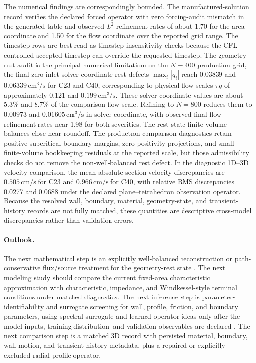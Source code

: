 The numerical findings are correspondingly bounded. The manufactured-solution
record verifies the declared forced operator with zero forcing-audit mismatch in
the generated table and observed $L^2$ refinement rates of about 1.70 for the
area coordinate and 1.50 for the flow coordinate over the reported grid range.
The timestep rows are best read as timestep-insensitivity checks because the
CFL-controlled accepted timestep can override the requested timestep. The
geometry-rest audit is the principal numerical limitation: on the $N=400$
production grid, the final zero-inlet solver-coordinate rest defects
$\max_i |q_i|$ reach $0.03839$ and $0.06339\,\mathrm{cm}^3/\mathrm{s}$ for C23
and C40, corresponding to physical-flow scales $\pi q$ of approximately
$0.121$ and $0.199\,\mathrm{cm}^3/\mathrm{s}$. These solver-coordinate values
are about 5.3\% and 8.7\% of the comparison flow scale. Refining to $N=800$
reduces them to $0.00973$ and $0.01605\,\mathrm{cm}^3/\mathrm{s}$ in solver
coordinate, with observed final-flow refinement rates near 1.98 for both
severities. The rest-state finite-volume balances close near roundoff. The
production comparison diagnostics retain positive subcritical boundary margins,
zero positivity projections, and small finite-volume bookkeeping residuals at
the reported scale, but those admissibility checks do not remove the
non-well-balanced rest defect. In the diagnostic 1D--3D velocity comparison, the
mean absolute section-velocity discrepancies are $0.505\,\mathrm{cm}/\mathrm{s}$
for C23 and $0.966\,\mathrm{cm}/\mathrm{s}$ for C40, with relative RMS
discrepancies 0.0277 and 0.0688 under the declared plane--tetrahedron
observation operator. Because the resolved wall, boundary, material,
geometry-state, and transient-history records are not fully matched, these
quantities are descriptive cross-model discrepancies rather than validation
errors.

\paragraph*{Outlook.}
The next mathematical step is an explicitly well-balanced reconstruction or
path-conservative flux/source treatment for the geometry-rest state
\cite{PimentelGarciaEtAl2025HighOrderWellBalanced}. The next modeling study
should compare the current fixed-area characteristic approximation with
characteristic, impedance, and Windkessel-style terminal conditions under matched
diagnostics. The next inference step is parameter-identifiability and
surrogate screening for wall, profile, friction, and boundary parameters, using
spectral-surrogate and learned-operator ideas only after the model inputs,
training distribution, and validation observables are declared
\cite{Colebank2025HemodynamicsIdentifiability,CsalaEtAl2025PCNDE,VelikorodnyEtAl2025DeepOperatorStenosed}.
The next comparison step is a matched 3D record with persisted material,
boundary, wall-motion, and transient-history metadata, plus a repaired or
explicitly excluded radial-profile operator.

